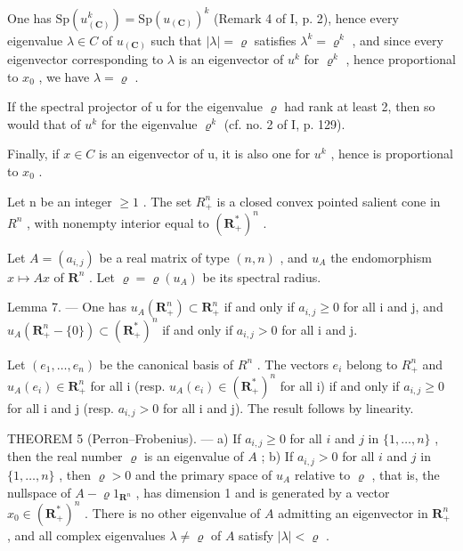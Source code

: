 One has \(\mathrm{Sp}(u_{(\mathbf{C})}^{k})=\mathrm{Sp}(u_{(\mathbf{C})})^{k}\) (Remark 4 of I, p. 2), hence every eigenvalue \(\lambda\in C\) of \(u_{(\mathbf{C})}\) such that \(|\lambda|=\varrho\) satisfies \(\lambda^{k}=\varrho^{k}\) , and since every eigenvector corresponding to \(\lambda\) is an eigenvector of \(u^{k}\) for \(\varrho^{k}\) , hence proportional to \(x_{0}\) , we have \(\lambda=\varrho\) .

If the spectral projector of u for the eigenvalue \(\varrho\) had rank at least 2, then so would that of \(u^{k}\) for the eigenvalue \(\varrho^{k}\) (cf. no. 2 of I, p. 129).

Finally, if \(x \in C\) is an eigenvector of u, it is also one for \(u^{k}\) , hence is proportional to \(x_{0}\) .

Let n be an integer \(\geqslant 1\) . The set \(R_{+}^{n}\) is a closed convex pointed salient cone in \(R^{n}\) , with nonempty interior equal to \((\mathbf{R}_{+}^{*})^{n}\) .

Let \(A = (a_{i,j})\) be a real matrix of type \((n,n)\) , and \(u_A\) the endomorphism \(x \mapsto Ax\) of \(\mathbf{R}^n\) . Let \(\varrho = \varrho(u_A)\) be its spectral radius.

Lemma 7. --- One has \(u_A(\mathbf{R}_+^n) \subset \mathbf{R}_+^n\) if and only if \(a_{i,j} \geqslant 0\) for all i and j, and \(u_A(\mathbf{R}_+^n - \{0\}) \subset (\mathbf{R}_+^*)^n\) if and only if \(a_{i,j} > 0\) for all i and j.

Let \((e_{1},\ldots,e_{n})\) be the canonical basis of \(R^{n}\) . The vectors \(e_{i}\) belong to \(R_{+}^{n}\) and \(u_{A}(e_{i})\in\mathbf{R}_{+}^{n}\) for all i (resp. \(u_{A}(e_{i})\in(\mathbf{R}_{+}^{*})^{n}\) for all i) if and only if \(a_{i,j}\geqslant0\) for all i and j (resp. \(a_{i,j}>0\) for all i and j). The result follows by linearity.

THEOREM 5 (Perron--Frobenius). --- a) If \(a_{i,j} \geqslant 0\) for all \(i\) and \(j\) in \(\{1,\ldots,n\}\) , then the real number \(\varrho\) is an eigenvalue of \(A\) ; b) If \(a_{i,j} > 0\) for all \(i\) and \(j\) in \(\{1,\ldots,n\}\) , then \(\varrho > 0\) and the primary space of \(u_A\) relative to \(\varrho\) , that is, the nullspace of \(A - \varrho 1_{\mathbf{R}^n}\) , has dimension 1 and is generated by a vector \(x_0 \in (\mathbf{R}_+^*)^n\) . There is no other eigenvalue of \(A\) admitting an eigenvector in \(\mathbf{R}_+^n\) , and all complex eigenvalues \(\lambda \neq \varrho\) of \(A\) satisfy \(|\lambda| < \varrho\) .

